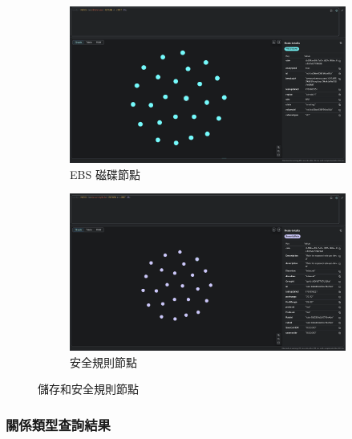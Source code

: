 \documentclass[11pt,a4paper]{ctexart}
\begin{document}
\begin{figure}[H]
\centering
\begin{subfigure}[b]{0.48\textwidth}
\centering
\includegraphics[width=\textwidth]{EBSVolumes.png}
\caption{EBS 磁碟節點}
\label{fig:ebs_nodes}
\end{subfigure}
\hfill
\begin{subfigure}[b]{0.48\textwidth}
\centering
\includegraphics[width=\textwidth]{SecurityRule.png}
\caption{安全規則節點}
\label{fig:rule_nodes}
\end{subfigure}
\caption{儲存和安全規則節點}
\label{fig:storage_security_nodes}
\end{figure}

\subsubsection{關係類型查詢結果}
\end{document}
